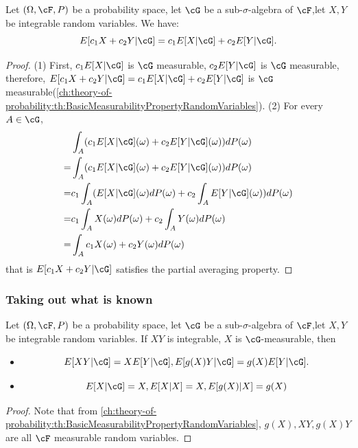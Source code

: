 \begin{refsection}
\begin{lemma}\cite[69]{shreve2004stochastic2}
Let $(\Omega,\cF,P)$ be a probability space, let $\cG$ be a sub-$\sigma$-algebra of $\cF$,let $X,Y$ be integrable random variables. We have:
	$$E[c_1 X + c_2 Y |\cG] = c_1 E[X|\cG] + c_2 E[Y|\cG].$$
\end{lemma}
\begin{proof}
(1) First, $c_1 E[X|\cG]$ is $\cG$ measurable, $c_2 E[Y|\cG]$ is $\cG$ measurable, therefore, 
$E[c_1 X + c_2 Y |\cG] = c_1 E[X|\cG] + c_2 E[Y|\cG]$ is $\cG$ measurable(\autoref{ch:theory-of-probability:th:BasicMeasurabilityPropertyRandomVariables}).
(2)	
For every $A\in \cG$,	
\begin{align*}
&\int_A (c_1E[X|\cG](\omega) + c_2E[Y|\cG](\omega))dP(\omega) \\
=& \int_A (c_1E[X|\cG](\omega) + c_2E[Y|\cG](\omega))dP(\omega) \\
=& c_1\int_A (E[X|\cG](\omega)dP(\omega) + c_2 \int_A E[Y|\cG](\omega))dP(\omega) \\
=&c_1\int_A X(\omega)dP(\omega) + c_2 \int_A Y(\omega)dP(\omega) \\
=&\int_A c_1X(\omega) + c_2  Y(\omega)dP(\omega) 
\end{align*}
that is $E[c_1 X + c_2 Y |\cG]$ satisfies the partial averaging property.
\end{proof}

\subsubsection{Taking out what is known}
\begin{lemma}\cite[70]{shreve2004stochastic2}Let $(\Omega,\cF,P)$ be a probability space, let $\cG$ be a sub-$\sigma$-algebra of $\cF$,let $X,Y$ be integrable random variables.
If $XY$ is integrable, $X$ is $\cG$-measurable, then
\begin{itemize}
	\item $$E[XY|\cG] = X E[Y|\cG], E[g(X)Y|\cG] = g(X)E[Y|\cG].$$
	\item
	$$E[X|\cG] = X,E[X|X] = X,E[g(X)|X]=g(X) $$
\end{itemize}
\end{lemma}
\begin{proof}
 Note that from \autoref{ch:theory-of-probability:th:BasicMeasurabilityPropertyRandomVariables}, $g(X),XY, g(X)Y$ are all $\cF$ measurable random variables. 
\end{proof}


\end{refsection}
